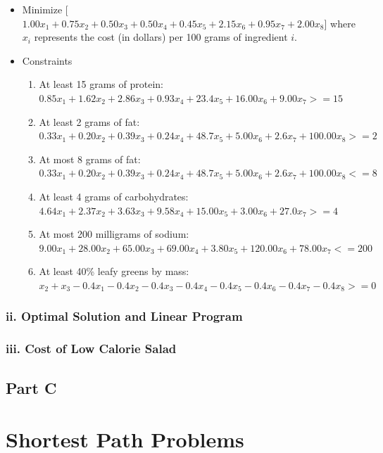 \documentclass[11pt]{scrreprt}
\begin{document}
\begin{itemize}
	\item Minimize
[$1.00x_{1}+0.75x_{2}+0.50x_{3}+0.50x_{4}+0.45x_{5}+2.15x_{6}+0.95x_{7}+2.00x_{8}$] where $x_{i}$ represents the cost (in dollars) per 100 grams of ingredient $i$.
	\item Constraints
	\begin{enumerate}
		\item At least 15 grams of protein:\\
		$0.85x_{1}+1.62x_{2}+2.86x_{3}+0.93x_{4}+23.4x_{5}+16.00x_{6}+9.00x_{7} >= 15$
		\item At least 2 grams of fat:\\
		$0.33x_{1}+0.20x_{2}+0.39x_{3}+0.24x_{4}+48.7x_{5}+5.00x_{6}+2.6x_{7}+100.00x_{8} >= 2$
		\item At most 8 grams of fat:\\
		$0.33x_{1}+0.20x_{2}+0.39x_{3}+0.24x_{4}+48.7x_{5}+5.00x_{6}+2.6x_{7}+100.00x_{8} <= 8$
		\item At least 4 grams of carbohydrates:\\
		$4.64x_{1}+2.37x_{2}+3.63x_{3}+9.58x_{4}+15.00x_{5}+3.00x_{6}+27.0x_{7} >= 4$
		\item At most 200 milligrams of sodium:\\
		$9.00x_{1}+28.00x_{2}+65.00x_{3}+69.00x_{4}+3.80x_{5}+120.00x_{6}+78.00x_{7} <= 200$
		\item At least 40\% leafy greens by mass:\\
		$x_{2}+x_{3}-0.4x_{1}-0.4x_{2}-0.4x_{3}-0.4x_{4}-0.4x_{5}-0.4x_{6}-0.4x_{7}-0.4x_{8} >= 0$
	\end{enumerate}
\end{itemize}


\subsection{ii. Optimal Solution and Linear Program}
\subsection{iii. Cost of Low Calorie Salad}

\section{Part C}

\chapter{Shortest Path Problems}
\end{document}
